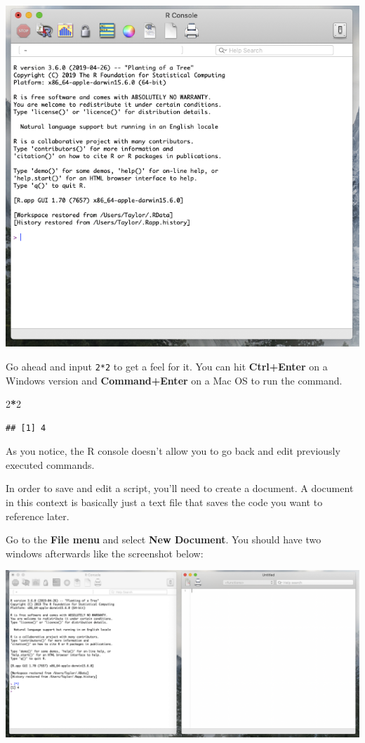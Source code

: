 \documentclass[
]{book}
\newenvironment{Shaded}{\begin{snugshade}}{\end{snugshade}}
\newcommand{\DecValTok}[1]{\textcolor[rgb]{0.00,0.00,0.81}{#1}}
\newcommand{\OperatorTok}[1]{\textcolor[rgb]{0.81,0.36,0.00}{\textbf{#1}}}
\begin{document}
\begin{center}\includegraphics[width=0.75\linewidth]{1.6_R_Console} \end{center}

Go ahead and input \texttt{2*2} to get a feel for it. You can hit \textbf{Ctrl+Enter} on a Windows version and \textbf{Command+Enter} on a Mac OS to run the command.

\begin{Shaded}
\begin{Highlighting}[]
  \DecValTok{2}\OperatorTok{*}\DecValTok{2}
\end{Highlighting}
\end{Shaded}

\begin{verbatim}
## [1] 4
\end{verbatim}

As you notice, the R console doesn't allow you to go back and edit previously executed commands.

In order to save and edit a script, you'll need to create a document. A document in this context is basically just a text file that saves the code you want to reference later.

Go to the \textbf{File menu} and select \textbf{New Document}. You should have two windows afterwards like the screenshot below:

\begin{center}\includegraphics[width=0.75\linewidth]{1.7_New_Document} \end{center}
\end{document}
